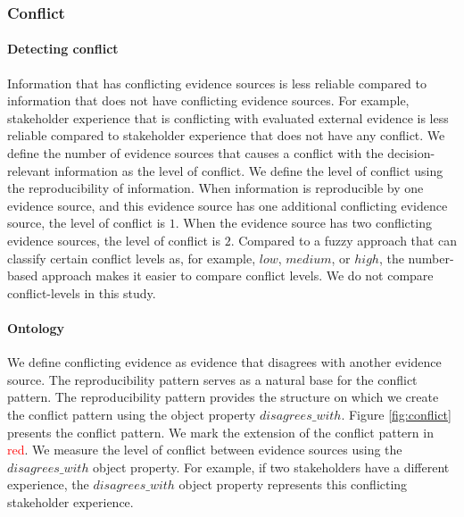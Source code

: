 \subsubsection{Conflict} \label{odp_conflict}
\paragraph{Detecting conflict}
Information that has conflicting evidence sources is less reliable compared to information that does not have conflicting evidence sources. For example, stakeholder experience that is conflicting with evaluated external evidence is less reliable compared to stakeholder experience that does not have any conflict. We define the number of evidence sources that causes a conflict with the decision-relevant information as the level of conflict. We define the level of conflict using the reproducibility of information. When information is reproducible by one evidence source, and this evidence source has one additional conflicting evidence source, the level of conflict is $1$. When the evidence source has two conflicting evidence sources, the level of conflict is $2$. Compared to a fuzzy approach that can classify certain conflict levels as, for example, $low$, $medium$, or $high$, the number-based approach makes it easier to compare conflict levels. We do not compare conflict-levels in this study.

\begin{center}
\large\color{document}{The conflict pattern validates information reliability by detecting conflicting evidence.} 
\end{center}

\paragraph{Ontology}
We define conflicting evidence as evidence that disagrees with another evidence source. The reproducibility pattern serves as a natural base for the conflict pattern. The reproducibility pattern provides the structure on which we create the conflict pattern using the object property $disagrees\_with$. Figure \ref{fig:conflict} presents the conflict pattern. We mark the extension of the conflict pattern in \textcolor{Red}{red}. We measure the level of conflict between evidence sources using the $disagrees\_with$ object property. For example, if two stakeholders have a different experience, the $disagrees\_with$ object property represents this conflicting stakeholder experience. 


